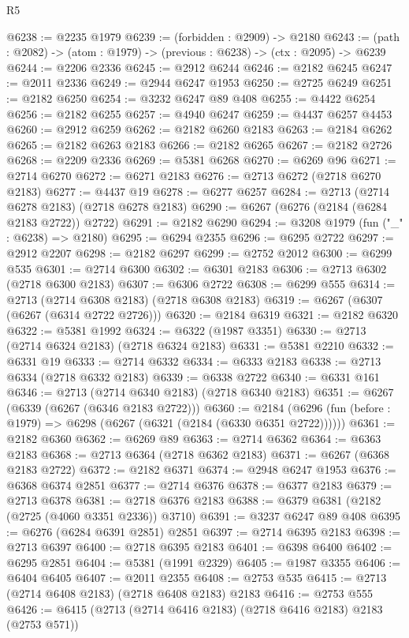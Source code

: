 \begin{lexlean}{R5}
\begin{coremodule}
@6238 := @2235 @1979
@6239 := (forbidden : @2909) -> @2180
@6243 := (path : @2082) -> (atom : @1979) -> (previous : @6238) -> (ctx : @2095) -> @6239
@6244 := @2206 @2336
@6245 := @2912 @6244
@6246 := @2182 @6245
@6247 := @2011 @2336
@6249 := @2944 @6247 @1953
@6250 := @2725 @6249
@6251 := @2182 @6250
@6254 := @3232 @6247 @89 @408
@6255 := @4422 @6254
@6256 := @2182 @6255
@6257 := @4940 @6247
@6259 := @4437 @6257 @4453
@6260 := @2912 @6259
@6262 := @2182 @6260 @2183
@6263 := @2184 @6262
@6265 := @2182 @6263 @2183
@6266 := @2182 @6265
@6267 := @2182 @2726
@6268 := @2209 @2336
@6269 := @5381 @6268
@6270 := @6269 @96
@6271 := @2714 @6270
@6272 := @6271 @2183
@6276 := @2713 @6272 (@2718 @6270 @2183)
@6277 := @4437 @19
@6278 := @6277 @6257
@6284 := @2713 (@2714 @6278 @2183) (@2718 @6278 @2183)
@6290 := @6267 (@6276 (@2184 (@6284 @2183 @2722)) @2722)
@6291 := @2182 @6290
@6294 := @3208 @1979 (fun ("_" : @6238) => @2180)
@6295 := @6294 @2355
@6296 := @6295 @2722
@6297 := @2912 @2207
@6298 := @2182 @6297
@6299 := @2752 @2012
@6300 := @6299 @535
@6301 := @2714 @6300
@6302 := @6301 @2183
@6306 := @2713 @6302 (@2718 @6300 @2183)
@6307 := @6306 @2722
@6308 := @6299 @555
@6314 := @2713 (@2714 @6308 @2183) (@2718 @6308 @2183)
@6319 := @6267 (@6307 (@6267 (@6314 @2722 @2726)))
@6320 := @2184 @6319
@6321 := @2182 @6320
@6322 := @5381 @1992
@6324 := @6322 (@1987 @3351)
@6330 := @2713 (@2714 @6324 @2183) (@2718 @6324 @2183)
@6331 := @5381 @2210
@6332 := @6331 @19
@6333 := @2714 @6332
@6334 := @6333 @2183
@6338 := @2713 @6334 (@2718 @6332 @2183)
@6339 := @6338 @2722
@6340 := @6331 @161
@6346 := @2713 (@2714 @6340 @2183) (@2718 @6340 @2183)
@6351 := @6267 (@6339 (@6267 (@6346 @2183 @2722)))
@6360 := @2184 (@6296 (fun (before : @1979) => @6298 (@6267 (@6321 (@2184 (@6330 @6351 @2722))))))
@6361 := @2182 @6360
@6362 := @6269 @89
@6363 := @2714 @6362
@6364 := @6363 @2183
@6368 := @2713 @6364 (@2718 @6362 @2183)
@6371 := @6267 (@6368 @2183 @2722)
@6372 := @2182 @6371
@6374 := @2948 @6247 @1953
@6376 := @6368 @6374 @2851
@6377 := @2714 @6376
@6378 := @6377 @2183
@6379 := @2713 @6378
@6381 := @2718 @6376 @2183
@6388 := @6379 @6381 (@2182 (@2725 (@4060 @3351 @2336)) @3710)
@6391 := @3237 @6247 @89 @408
@6395 := @6276 (@6284 @6391 @2851) @2851
@6397 := @2714 @6395 @2183
@6398 := @2713 @6397
@6400 := @2718 @6395 @2183
@6401 := @6398 @6400
@6402 := @6295 @2851
@6404 := @5381 (@1991 @2329)
@6405 := @1987 @3355
@6406 := @6404 @6405
@6407 := @2011 @2355
@6408 := @2753 @535
@6415 := @2713 (@2714 @6408 @2183) (@2718 @6408 @2183) @2183
@6416 := @2753 @555
@6426 := @6415 (@2713 (@2714 @6416 @2183) (@2718 @6416 @2183) @2183 (@2753 @571))

\end{coremodule}
\end{lexlean}
